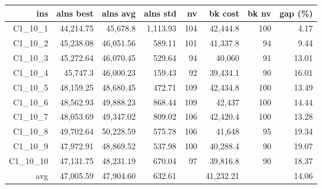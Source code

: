   \begin{table}[caption={Kết quả đo với tập HG\_C\_1\_10 1000 yêu cầu}, label=exp:HGC110]
    \small
    \centering
    \begin{tabular}{rrrrrrrr}
    \hline
    ins & alns best & alns avg & alns std & nv & bk cost & bk nv & gap (\%) \\ \hline
    C1\_10\_1 & 44,214.75 & 45,678.8 & 1,113.93 & 104 & 42,444.8 & 100 & 4.17 \\ \hline
    C1\_10\_2 & 45,238.08 & 46,051.56 & 589.11 & 101 & 41,337.8 & 94 & 9.44 \\ \hline
    C1\_10\_3 & 45,272.64 & 46,070.45 & 529.64 & 94 & 40,060 & 91 & 13.01 \\ \hline
    C1\_10\_4 & 45,747.3 & 46,000.23 & 159.43 & 92 & 39,434.1 & 90 & 16.01 \\ \hline
    C1\_10\_5 & 48,159.25 & 48,680.45 & 472.71 & 109 & 42,434.8 & 100 & 13.49 \\ \hline
    C1\_10\_6 & 48,562.93 & 49,888.23 & 868.44 & 109 & 42,437 & 100 & 14.44 \\ \hline
    C1\_10\_7 & 48,053.69 & 49,347.02 & 809.02 & 106 & 42,420.4 & 100 & 13.28 \\ \hline
    C1\_10\_8 & 49,702.64 & 50,228.59 & 575.78 & 106 & 41,648 & 95 & 19.34 \\ \hline
    C1\_10\_9 & 47,972.91 & 48,869.52 & 537.98 & 100 & 40,288.4 & 90 & 19.07 \\ \hline
    C1\_10\_10 & 47,131.75 & 48,231.19 & 670.04 & 97 & 39,816.8 & 90 & 18.37 \\ \hline
    avg & 47,005.59 & 47,904.60 & 632.61 & & 41,232.21 & & 14.06 \\ \hline
    \end{tabular}
  \end{table}

